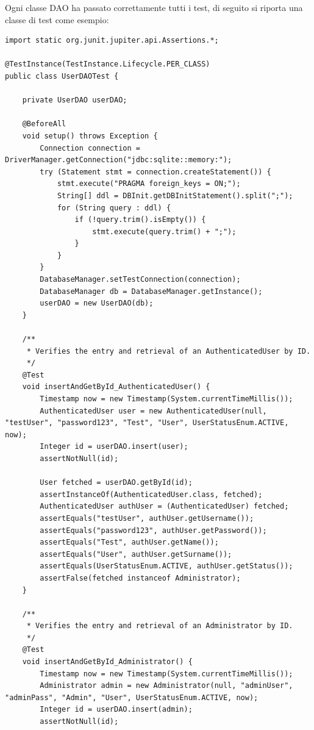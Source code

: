 \documentclass[a4paper]{article}
\begin{document}
Ogni classe DAO ha passato correttamente tutti i test, di seguito si riporta una classe di test come esempio:

\begin{lstlisting}[style=java-style, caption={Esempio test per la classe \texttt{UserTest.java}}]
import static org.junit.jupiter.api.Assertions.*;

@TestInstance(TestInstance.Lifecycle.PER_CLASS)
public class UserDAOTest {

    private UserDAO userDAO;

    @BeforeAll
    void setup() throws Exception {
        Connection connection = DriverManager.getConnection("jdbc:sqlite::memory:");
        try (Statement stmt = connection.createStatement()) {
            stmt.execute("PRAGMA foreign_keys = ON;");
            String[] ddl = DBInit.getDBInitStatement().split(";");
            for (String query : ddl) {
                if (!query.trim().isEmpty()) {
                    stmt.execute(query.trim() + ";");
                }
            }
        }
        DatabaseManager.setTestConnection(connection);
        DatabaseManager db = DatabaseManager.getInstance();
        userDAO = new UserDAO(db);
    }

    /**
     * Verifies the entry and retrieval of an AuthenticatedUser by ID.
     */
    @Test
    void insertAndGetById_AuthenticatedUser() {
        Timestamp now = new Timestamp(System.currentTimeMillis());
        AuthenticatedUser user = new AuthenticatedUser(null, "testUser", "password123", "Test", "User", UserStatusEnum.ACTIVE, now);
        Integer id = userDAO.insert(user);
        assertNotNull(id);

        User fetched = userDAO.getById(id);
        assertInstanceOf(AuthenticatedUser.class, fetched);
        AuthenticatedUser authUser = (AuthenticatedUser) fetched;
        assertEquals("testUser", authUser.getUsername());
        assertEquals("password123", authUser.getPassword());
        assertEquals("Test", authUser.getName());
        assertEquals("User", authUser.getSurname());
        assertEquals(UserStatusEnum.ACTIVE, authUser.getStatus());
        assertFalse(fetched instanceof Administrator);
    }

    /**
     * Verifies the entry and retrieval of an Administrator by ID.
     */
    @Test
    void insertAndGetById_Administrator() {
        Timestamp now = new Timestamp(System.currentTimeMillis());
        Administrator admin = new Administrator(null, "adminUser", "adminPass", "Admin", "User", UserStatusEnum.ACTIVE, now);
        Integer id = userDAO.insert(admin);
        assertNotNull(id);


\end{lstlisting}
\end{document}
